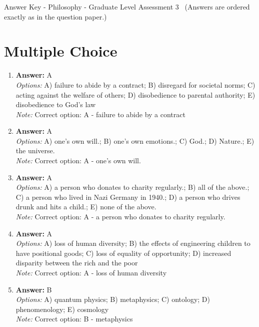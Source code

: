 \documentclass[12pt]{article}
\begin{document}
\begin{center}
Answer Key - Philosophy - Graduate Level Assessment 3 \
\small (Answers are ordered exactly as in the question paper.)
\end{center}

\section*{Multiple Choice}
\begin{enumerate}[label=\arabic*.]
\item \textbf{Answer:} A
\\ \textit{Options:} A) failure to abide by a contract; B) disregard for societal norms; C) acting against the welfare of others; D) disobedience to parental authority; E) disobedience to God's law
\\ \textit{Note:} Correct option: A - failure to abide by a contract
\item \textbf{Answer:} A
\\ \textit{Options:} A) one's own will.; B) one's own emotions.; C) God.; D) Nature.; E) the universe.
\\ \textit{Note:} Correct option: A - one's own will.
\item \textbf{Answer:} A
\\ \textit{Options:} A) a person who donates to charity regularly.; B) all of the above.; C) a person who lived in Nazi Germany in 1940.; D) a person who drives drunk and hits a child.; E) none of the above.
\\ \textit{Note:} Correct option: A - a person who donates to charity regularly.
\item \textbf{Answer:} A
\\ \textit{Options:} A) loss of human diversity; B) the effects of engineering children to have positional goods; C) loss of equality of opportunity; D) increased disparity between the rich and the poor
\\ \textit{Note:} Correct option: A - loss of human diversity
\item \textbf{Answer:} B
\\ \textit{Options:} A) quantum physics; B) metaphysics; C) ontology; D) phenomenology; E) cosmology
\\ \textit{Note:} Correct option: B - metaphysics
\end{enumerate}
\end{document}
